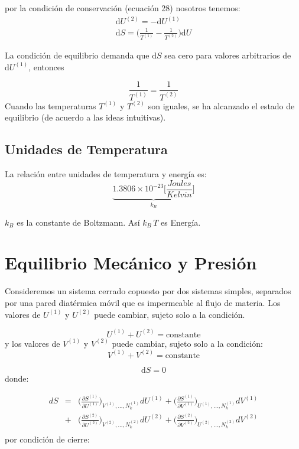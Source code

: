 \documentclass[10pt,twocolumn]{IEEEtran2e}
\newcommand{\ud}{\mathrm{d}}
\begin{document}
por la condici\'on de conservaci\'on (ecuaci\'on 28) nosotros tenemos:
\begin{eqnarray}
 \ud U^{(2)} = - \ud U^{(1)}\\
 \ud S= \bigg(\frac{1}{T^{(1)}}-\frac{1}{T^{(2)}} \bigg) \ud U
\end{eqnarray}

La condici\'on de equilibrio demanda que $\ud S$ sea cero para valores arbitrarios de $\ud U^{(1)}$, entonces

\begin{equation}
 \frac{1}{T^{(1)}} = \frac{1}{T^{(2)}}
\end{equation}
Cuando las temperaturas $T^{(1)}$ y $T^{(2)}$ son iguales, se ha alcanzado el estado de equilibrio (de acuerdo a las ideas intuitivas).

\subsection*{Unidades de Temperatura}

La relaci\'on entre unidades de temperatura y energ\'ia es:
\begin{equation}
\underbrace{1.3806\times 10^{-23} \bigg[ \frac{Joules}{Kelvin} \bigg]}_{k_{B}}
\end{equation}

$k_{B}$ es la constante de Boltzmann. As\'i $k_{B}\,T$ es Energ\'ia.

\section{Equilibrio Mec\'anico y Presi\'on}
Consideremos un sistema cerrado copuesto por dos sistemas simples, separados por una pared diat\'ermica m\'ovil que es impermeable al flujo de materia. Los valores de $U^{(1)}$ y $U^{(2)}$ puede cambiar, sujeto solo a la condici\'on.

\begin{equation}
 U^{(1)} + U^{(2)} = \textrm{constante}
\end{equation}
y los valores de $V^{(1)}$ y $V^{(2)}$ puede cambiar, sujeto solo a la condici\'on:
\begin{equation}
 V^{(1)} + V^{(2)} = \textrm{constante}
\end{equation}

\begin{equation}
 \ud S=0
\end{equation}
donde:

\begin{eqnarray}
  dS & = & \bigg(\frac{\partial S^{(1)}}{\partial U^{(1)}}\bigg)_{V^{(1)},...,N_{k}^{(1)}} dU^{(1)} + \bigg(\frac{\partial S^{(1)}}{\partial V^{(1)}}\bigg)_{U^{(1)},...,N_{k}^{(1)}} dV^{(1)} \nonumber\\
    & + & \bigg(\frac{\partial S^{(2)}}{\partial U^{(2)}}\bigg)_{V^{(2)},...,N_{k}^{(2)}} dU^{(2)} + \bigg(\frac{\partial S^{(2)}}{\partial V^{(2)}}\bigg)_{U^{(2)},...,N_{k}^{(2)}} dV^{(2)}\nonumber \\
\end{eqnarray}
por condici\'on de cierre:
\end{document}
